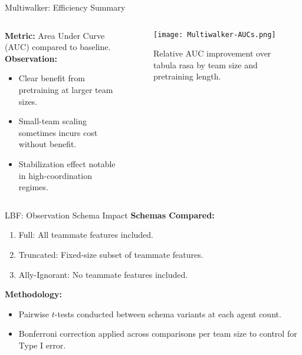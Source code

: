 \begin{frame}{Multiwalker: Efficiency Summary}
    \begin{columns}
        \begin{column}{0.45\linewidth}
            \textbf{Metric:} Area Under Curve (AUC) compared to baseline. \\
            \textbf{Observation:}
            \begin{itemize}
                \item Clear benefit from pretraining at larger team sizes.
                \item Small-team scaling sometimes incurs cost without benefit.
                \item Stabilization effect notable in high-coordination regimes.
            \end{itemize}
        \end{column}
        \begin{column}{0.55\linewidth}
            \begin{figure}
                \texttt{[image: Multiwalker-AUCs.png]}
                \caption{Relative AUC improvement over tabula rasa by team size and pretraining length.}
            \end{figure}
        \end{column}
    \end{columns}
\end{frame}

\begin{frame}{LBF: Observation Schema Impact}
    \textbf{Schemas Compared:}
    \begin{enumerate}
        \item Full: All teammate features included.
        \item Truncated: Fixed-size subset of teammate features.
        \item Ally-Ignorant: No teammate features included.
    \end{enumerate}

    \vspace{1em}
    \textbf{Methodology:}
    \begin{itemize}
        \item Pairwise $t$-tests conducted between schema variants at each agent count.
        \item Bonferroni correction applied across comparisons per team size to control for Type I error.
    \end{itemize}
\end{frame}

